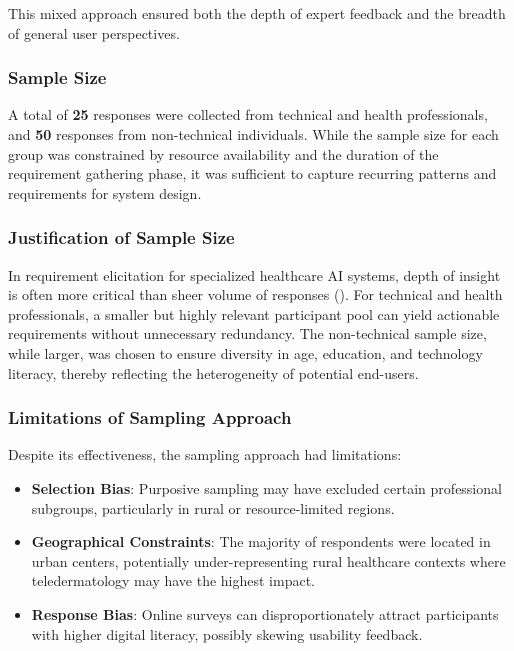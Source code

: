 \documentclass[
  12pt,
  oneside]{article}
\providecommand{\tightlist}{%
  \setlength{\itemsep}{0pt}\setlength{\parskip}{0pt}}
\begin{document}
This mixed approach ensured both the depth of expert feedback and the
breadth of general user perspectives.

\subsubsection{Sample Size}\label{sample-size}

A total of \textbf{25} responses were collected from technical and
health professionals, and \textbf{50} responses from non-technical
individuals. While the sample size for each group was constrained by
resource availability and the duration of the requirement gathering
phase, it was sufficient to capture recurring patterns and requirements
for system design.

\subsubsection{Justification of Sample
Size}\label{justification-of-sample-size}

In requirement elicitation for specialized healthcare AI systems, depth
of insight is often more critical than sheer volume of responses
(). For technical
and health professionals, a smaller but highly relevant participant pool
can yield actionable requirements without unnecessary redundancy. The
non-technical sample size, while larger, was chosen to ensure diversity
in age, education, and technology literacy, thereby reflecting the
heterogeneity of potential end-users.

\subsubsection{Limitations of Sampling
Approach}\label{limitations-of-sampling-approach}

Despite its effectiveness, the sampling approach had limitations:

\begin{itemize}
\tightlist
\item
  \textbf{Selection Bias}: Purposive sampling may have excluded certain
  professional subgroups, particularly in rural or resource-limited
  regions.
\item
  \textbf{Geographical Constraints}: The majority of respondents were
  located in urban centers, potentially under-representing rural
  healthcare contexts where teledermatology may have the highest impact.
\item
  \textbf{Response Bias}: Online surveys can disproportionately attract
  participants with higher digital literacy, possibly skewing usability
  feedback.
\end{itemize}
\end{document}

